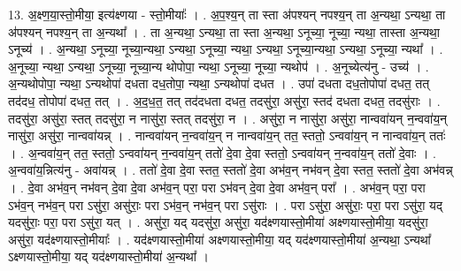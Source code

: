 \documentclass[17pt]{extarticle}
\begin{document}
13. अ॒क्ष्ण॒या॒स्तो॒मीया॒ इत्य॑क्ष्णया - स्तो॒मीयाः᳚ । . अ॒प॒श्य॒न् ता स्ता अ॑पश्यन् नपश्य॒न् ता अ॒न्यथा॒ ऽन्यथा॒ ता अ॑पश्यन् नपश्य॒न् ता अ॒न्यथा᳚ । . ता अ॒न्यथा॒ ऽन्यथा॒ ता स्ता अ॒न्यथा॒ ऽनूच्या॒ नूच्या॒ न्यथा॒ तास्ता अ॒न्यथा॒ ऽनूच्य॑ । . अ॒न्यथा॒ ऽनूच्या॒ नूच्या॒न्यथा॒ ऽन्यथा॒ ऽनूच्या॒ न्यथा॒ ऽन्यथा॒ ऽनूच्या॒न्यथा॒ ऽन्यथा॒ ऽनूच्या॒ न्यथा᳚ । . अ॒नूच्या॒ न्यथा॒ ऽन्यथा॒ ऽनूच्या॒ नूच्या॒न्य थोपोपा॒ न्यथा॒ ऽनूच्या॒ नूच्या॒ न्यथोप॑ । . अ॒नूच्येत्य॑नु - उच्य॑ । . अ॒न्यथोपोपा॒ न्यथा॒ ऽन्यथोपा॑ दधता दध॒तोपा॒ न्यथा॒ ऽन्यथोपा॑ दधत । . उपा॑ दधता दध॒तोपोपा॑ दधत॒ तत् तद॑दध॒ तोपोपा॑ दधत॒ तत् । . अ॒द॒ध॒त॒ तत् तद॑दधता दधत॒ तदसु॑रा॒ असु॑रा॒ स्तद॑ दधता दधत॒ तदसु॑राः । . तदसु॑रा॒ असु॑रा॒ स्तत् तदसु॑रा॒ न नासु॑रा॒ स्तत् तदसु॑रा॒ न । . असु॑रा॒ न नासु॑रा॒ असु॑रा॒ नान्ववा॑यन् न॒न्ववा॑य॒न् नासु॑रा॒ असु॑रा॒ नान्ववा॑यन्न् । . नान्ववा॑यन् न॒न्ववा॑य॒न् न नान्ववा॑य॒न् तत॒ स्ततो॒ ऽन्ववा॑य॒न् न नान्ववा॑य॒न् ततः॑ । . अ॒न्ववा॑य॒न् तत॒ स्ततो॒ ऽन्ववा॑यन् न॒न्ववा॑य॒न् ततो॑ दे॒वा दे॒वा स्ततो॒ ऽन्ववा॑यन् न॒न्ववा॑य॒न् ततो॑ दे॒वाः । . अ॒न्ववा॑य॒न्नित्य॑नु - अवा॑यन्न् । . ततो॑ दे॒वा दे॒वा स्तत॒ स्ततो॑ दे॒वा अभ॑व॒न् नभ॑वन् दे॒वा स्तत॒ स्ततो॑ दे॒वा अभ॑वन्न् । . दे॒वा अभ॑व॒न् नभ॑वन् दे॒वा दे॒वा अभ॑व॒न् परा॒ परा ऽभ॑वन् दे॒वा दे॒वा अभ॑व॒न् परा᳚ । . अभ॑व॒न् परा॒ परा ऽभ॑व॒न् नभ॑व॒न् परा ऽसु॑रा॒ असु॑राः॒ परा ऽभ॑व॒न् नभ॑व॒न् परा ऽसु॑राः । . परा ऽसु॑रा॒ असु॑राः॒ परा॒ परा ऽसु॑रा॒ यद् यदसु॑राः॒ परा॒ परा ऽसु॑रा॒ यत् । . असु॑रा॒ यद् यदसु॑रा॒ असु॑रा॒ यद॑क्ष्णयास्तो॒मीया॑ अक्ष्णयास्तो॒मीया॒ यदसु॑रा॒ असु॑रा॒ यद॑क्ष्णयास्तो॒मीयाः᳚ । . यद॑क्ष्णयास्तो॒मीया॑ अक्ष्णयास्तो॒मीया॒ यद् यद॑क्ष्णयास्तो॒मीया॑ अ॒न्यथा॒ ऽन्यथा᳚ ऽक्ष्णयास्तो॒मीया॒ यद् यद॑क्ष्णयास्तो॒मीया॑ अ॒न्यथा᳚ । \newline
\end{document}
